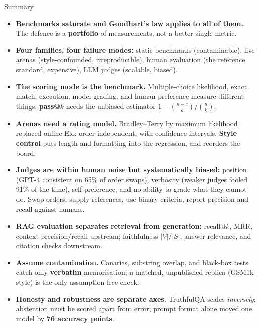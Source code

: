 \begin{frame}[allowframebreaks]{Summary}
  \begin{itemize}\scriptsize\itemsep0.28em
    \item[\textcolor{red}{$\blacktriangleright$}] \textbf{Benchmarks saturate and Goodhart's law applies to all of them.} The defence is a \textbf{portfolio} of measurements, not a better single metric.
    \item[\textcolor{red}{$\blacktriangleright$}] \textbf{Four families, four failure modes:} static benchmarks (contaminable), live arenas (style-confounded, irreproducible), human evaluation (the reference standard, expensive), LLM judges (scalable, biased).
    \item[\textcolor{red}{$\blacktriangleright$}] \textbf{The scoring mode is the benchmark.} Multiple-choice likelihood, exact match, execution, model grading, and human preference measure different things. \textbf{pass@$k$} needs the unbiased estimator $1 - \binom{n-c}{k}/\binom{n}{k}$.
    \item[\textcolor{red}{$\blacktriangleright$}] \textbf{Arenas need a rating model.} Bradley--Terry by maximum likelihood replaced online Elo: order-independent, with confidence intervals. \textbf{Style control} puts length and formatting into the regression, and reorders the board.
    \item[\textcolor{red}{$\blacktriangleright$}] \textbf{Judges are within human noise but systematically biased:} position (GPT-4 consistent on 65\% of order swaps), verbosity (weaker judges fooled 91\% of the time), self-preference, and no ability to grade what they cannot do. Swap orders, supply references, use binary criteria, report precision and recall against humans.
    \item[\textcolor{red}{$\blacktriangleright$}] \textbf{RAG evaluation separates retrieval from generation:} recall@$k$, MRR, context precision/recall upstream; faithfulness $|V|/|S|$, answer relevance, and citation checks downstream.
    \item[\textcolor{red}{$\blacktriangleright$}] \textbf{Assume contamination.} Canaries, substring overlap, and black-box tests catch only \textbf{verbatim} memorisation; a matched, unpublished replica (GSM1k-style) is the only assumption-free check.
    \item[\textcolor{red}{$\blacktriangleright$}] \textbf{Honesty and robustness are separate axes.} TruthfulQA scales \textit{inversely}; abstention must be scored apart from error; prompt format alone moved one model by \textbf{76 accuracy points}.

\end{itemize}
\end{frame}
